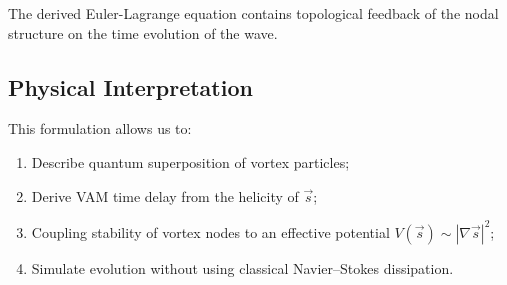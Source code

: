 The derived Euler-Lagrange equation contains topological feedback of the nodal structure on the time evolution of the wave.

\subsection{Physical Interpretation}

This formulation allows us to:
\begin{enumerate}
    \item Describe quantum superposition of vortex particles; \item Derive VAM time delay from the helicity of $\vec{s}$;
    \item Coupling stability of vortex nodes to an effective potential \( V(\vec{s}) \sim |\nabla \vec{s}|^2 \);
    \item Simulate evolution without using classical Navier–Stokes dissipation.
\end{enumerate}